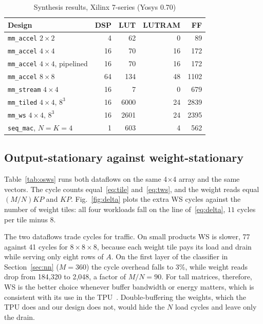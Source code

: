\documentclass[conference]{IEEEtran}
\newcommand{\code}[1]{\texttt{#1}}
\begin{document}
\begin{table}[t]
\centering
\caption{Synthesis results, Xilinx 7-series (Yosys 0.70)}
\label{tab:synth}
\begin{tabular}{lrrrr}
\toprule
Design & DSP & LUT & LUTRAM & FF \\
\midrule
\code{mm\_accel} $2{\times}2$ & 4 & 62 & 0 & 89 \\
\code{mm\_accel} $4{\times}4$ & 16 & 70 & 16 & 172 \\
\code{mm\_accel} $4{\times}4$, pipelined & 16 & 70 & 16 & 172 \\
\code{mm\_accel} $8{\times}8$ & 64 & 134 & 48 & 1102 \\
\code{mm\_stream} $4{\times}4$ & 16 & 7 & 0 & 679 \\
\code{mm\_tiled} $4{\times}4$, $8^3$ & 16 & 6000 & 24 & 2839 \\
\code{mm\_ws} $4{\times}4$, $8^3$ & 16 & 2601 & 24 & 2395 \\
\code{seq\_mac}, $N{=}K{=}4$ & 1 & 603 & 4 & 562 \\
\bottomrule
\end{tabular}
\end{table}

\subsection{Output-stationary against weight-stationary}
\label{sec:osws}
Table~\ref{tab:osws} runs both dataflows on the same 4$\times$4 array and the same vectors. The cycle counts equal~\eqref{eq:tile} and~\eqref{eq:tws}, and the weight reads equal $(M/N)KP$ and $KP$. Fig.~\ref{fig:delta} plots the extra WS cycles against the number of weight tiles: all four workloads fall on the line of~\eqref{eq:delta}, $11$ cycles per tile minus 8.

The two dataflows trade cycles for traffic. On small products WS is slower, 77 against 41 cycles for $8\times8\times8$, because each weight tile pays its load and drain while serving only eight rows of $A$. On the first layer of the classifier in Section~\ref{sec:nn} ($M = 360$) the cycle overhead falls to 3\%, while weight reads drop from 184,320 to 2,048, a factor of $M/N = 90$. For tall matrices, therefore, WS is the better choice whenever buffer bandwidth or energy matters, which is consistent with its use in the TPU~\cite{jouppi2017}. Double-buffering the weights, which the TPU does and our design does not, would hide the $N$ load cycles and leave only the drain.
\end{document}
